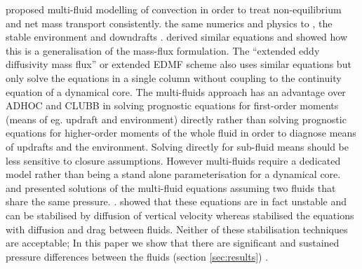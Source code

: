 \documentclass[draft]{agujournal2019}
\begin{document}
 proposed multi-fluid modelling of convection in order
to treat non-equilibrium and net mass transport  consistently.
 the same numerics and physics to , the stable environment and downdrafts .  derived similar
equations  and showed how this is a generalisation
of the mass-flux formulation. The  ``extended eddy
diffusivity mass flux'' or extended EDMF scheme also uses similar
equations but 
{only solve the equations in a single column without coupling to the continuity equation of a dynamical core.}
{The multi-fluids approach has an advantage over ADHOC and CLUBB in solving prognostic equations for first-order moments (means of eg. updraft and environment) directly rather than solving prognostic equations for higher-order moments of the whole fluid in order to diagnose means of updrafts and the environment. Solving directly for sub-fluid means should be less sensitive to closure assumptions. However} multi-fluids require
a dedicated model rather than being a stand alone parameterisation
for a dynamical core.  and  presented solutions
of the multi-fluid equations assuming two fluids that share the same
pressure. .  showed that these equations  are in fact unstable and can be stabilised by diffusion of vertical
velocity whereas  stabilised the equations with diffusion
and drag between fluids. Neither of these stabilisation techniques
are acceptable;
In this paper we show that there are significant
and sustained pressure differences between the fluids (section \ref{sec:results}) . 
\end{document}
